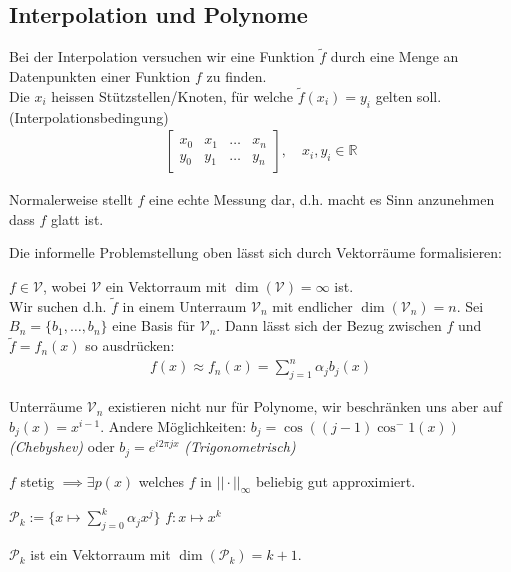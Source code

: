 \subsection{Interpolation und Polynome}
Bei der Interpolation versuchen wir eine Funktion $\tilde{f}$ durch eine Menge an Datenpunkten einer Funktion $f$ zu finden.\\
Die $x_i$ heissen Stützstellen/Knoten, für welche $\tilde{f}(x_i) = y_i$ gelten soll. (Interpolationsbedingung)
\begin{align*}
	\begin{bmatrix}
		x_0 & x_1 & \ldots & x_n \\
		y_0 & y_1 & \ldots & y_n
	\end{bmatrix},
	\quad x_i, y_i \in \mathbb{R}
\end{align*}

Normalerweise stellt $f$ eine echte Messung dar, d.h. macht es Sinn anzunehmen dass $f$ glatt ist.

Die informelle Problemstellung oben lässt sich durch Vektorräume formalisieren:

$f \in \mathcal{V}$, wobei $\mathcal{V}$ ein Vektorraum mit $\dim(\mathcal{V}) = \infty$ ist. \\
Wir suchen d.h. $\tilde{f}$ in einem Unterraum $\mathcal{V}_n$ mit endlicher $\dim(\mathcal{V}_n) = n$.
Sei $B_n = \{b_1,\ldots,b_n\}$ eine Basis für $\mathcal{V}_n$.
Dann lässt sich der Bezug zwischen $f$ und $\tilde{f} = f_n(x)$ so ausdrücken:
\begin{align*}
	f(x) \approx f_n(x) = \sum_{j=1}^n \alpha_j b_j(x)
\end{align*}

\setcounter{all}{2}
\inlineremark Unterräume $\mathcal{V}_n$ existieren nicht nur für Polynome, wir beschränken uns aber auf $b_j(x) = x^{i-1}$.
Andere Möglichkeiten: $b_j = \cos((j-1)\cos^-1(x))$ \textit{(Chebyshev)} oder $b_j = e^{i2\pi j x}$ \textit{(Trigonometrisch)}


\setcounter{all}{5}
 $f$ stetig $\implies \exists p(x)$ welches $f$ in $||\cdot||_\infty$ beliebig gut approximiert.

\setcounter{all}{7}
 $\mathcal{P}_k := \{ x \mapsto \sum_{j = 0}^{k} \alpha_j x^j \}$
 $f: x \mapsto x^k$

 $\mathcal{P}_k$ ist ein Vektorraum mit $\dim(\mathcal{P}_k) = k+1$.
